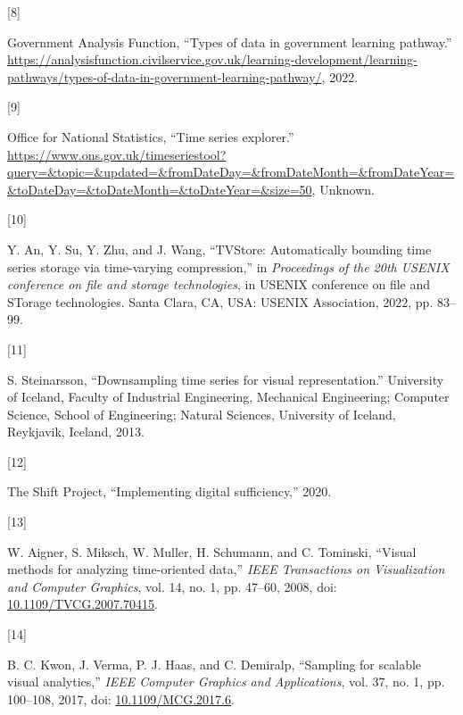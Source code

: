 \documentclass{article}
\newlength{\cslhangindent}
\newlength{\csllabelwidth}
\newlength{\cslentryspacingunit} %
\newenvironment{CSLReferences}[2] %
 {%
  \setlength{\parindent}{0pt}
  \ifodd #1
  \let\oldpar\par
  \def\par{\hangindent=\cslhangindent\oldpar}
  \fi
  \setlength{\parskip}{#2\cslentryspacingunit}
 }%
 {}
\newcommand{\CSLLeftMargin}[1]{\parbox[t]{\csllabelwidth}{#1}}
\newcommand{\CSLRightInline}[1]{\parbox[t]{\linewidth - \csllabelwidth}{#1}\break}
\begin{document}
\begin{CSLReferences}{0}{0}
\leavevmode{}%
\CSLLeftMargin{{[}8{]} }
\CSLRightInline{Government Analysis Function, {``Types of data in
government learning pathway.''}
\url{https://analysisfunction.civilservice.gov.uk/learning-development/learning-pathways/types-of-data-in-government-learning-pathway/},
2022.}

\leavevmode{}%
\CSLLeftMargin{{[}9{]} }
\CSLRightInline{Office for National Statistics, {``Time series
explorer.''}
\url{https://www.ons.gov.uk/timeseriestool?query=\&topic=\&updated=\&fromDateDay=\&fromDateMonth=\&fromDateYear=\&toDateDay=\&toDateMonth=\&toDateYear=\&size=50},
Unknown.}

\leavevmode{}%
\CSLLeftMargin{{[}10{]} }
\CSLRightInline{Y. An, Y. Su, Y. Zhu, and J. Wang, {``TVStore:
Automatically bounding time series storage via time-varying
compression,''} in \emph{Proceedings of the 20th USENIX conference on
file and storage technologies}, in USENIX conference on file and STorage
technologies. Santa Clara, CA, USA: USENIX Association, 2022, pp.
83--99.}

\leavevmode{}%
\CSLLeftMargin{{[}11{]} }
\CSLRightInline{S. Steinarsson, {``Downsampling time series for visual
representation.''} University of Iceland, Faculty of Industrial
Engineering, Mechanical Engineering; Computer Science, School of
Engineering; Natural Sciences, University of Iceland, Reykjavik,
Iceland, 2013.}

\leavevmode{}%
\CSLLeftMargin{{[}12{]} }
\CSLRightInline{The Shift Project, {``Implementing digital
sufficiency,''} 2020.}

\leavevmode{}%
\CSLLeftMargin{{[}13{]} }
\CSLRightInline{W. Aigner, S. Miksch, W. Muller, H. Schumann, and C.
Tominski, {``Visual methods for analyzing time-oriented data,''}
\emph{IEEE Transactions on Visualization and Computer Graphics}, vol.
14, no. 1, pp. 47--60, 2008, doi:
\href{https://doi.org/10.1109/TVCG.2007.70415}{10.1109/TVCG.2007.70415}.}

\leavevmode{}%
\CSLLeftMargin{{[}14{]} }
\CSLRightInline{B. C. Kwon, J. Verma, P. J. Haas, and C. Demiralp,
{``Sampling for scalable visual analytics,''} \emph{IEEE Computer
Graphics and Applications}, vol. 37, no. 1, pp. 100--108, 2017, doi:
\href{https://doi.org/10.1109/MCG.2017.6}{10.1109/MCG.2017.6}.}


\end{CSLReferences}
\end{document}
